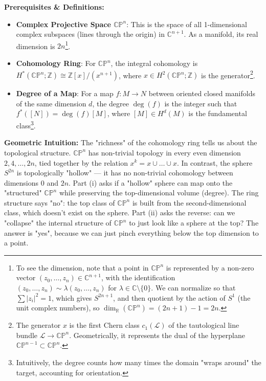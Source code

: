 \begin{solution}
\textbf{Prerequisites \& Definitions:}
\begin{itemize}
    \item \textbf{Complex Projective Space $\mathbb{CP}^n$}: This is the space of all 1-dimensional complex subspaces (lines through the origin) in $\mathbb{C}^{n+1}$. As a manifold, its real dimension is $2n$\footnote{To see the dimension, note that a point in $\mathbb{CP}^n$ is represented by a non-zero vector $(z_0, \dots, z_n) \in \mathbb{C}^{n+1}$, with the identification $(z_0, \dots, z_n) \sim \lambda(z_0, \dots, z_n)$ for $\lambda \in \mathbb{C} \setminus \{0\}$. We can normalize so that $\sum |z_i|^2 = 1$, which gives $S^{2n+1}$, and then quotient by the action of $S^1$ (the unit complex numbers), so $\dim_{\mathbb{R}}(\mathbb{CP}^n) = (2n+1) - 1 = 2n$.}.
    \item \textbf{Cohomology Ring}: For $\mathbb{CP}^n$, the integral cohomology is $H^*(\mathbb{CP}^n; \mathbb{Z}) \cong \mathbb{Z}[x]/(x^{n+1})$, where $x \in H^2(\mathbb{CP}^n; \mathbb{Z})$ is the generator\footnote{The generator $x$ is the first Chern class $c_1(\mathcal{L})$ of the tautological line bundle $\mathcal{L} \to \mathbb{CP}^n$. Geometrically, it represents the dual of the hyperplane $\mathbb{CP}^{n-1} \subset \mathbb{CP}^n$.}.
    \item \textbf{Degree of a Map}: For a map $f: M \to N$ between oriented closed manifolds of the same dimension $d$, the degree $\deg(f)$ is the integer such that $f^*([N]) = \deg(f)[M]$, where $[M] \in H^d(M)$ is the fundamental class\footnote{Intuitively, the degree counts how many times the domain "wraps around" the target, accounting for orientation.}.
\end{itemize}

\textbf{Geometric Intuition:}
The "richness" of the cohomology ring tells us about the topological structure. $\mathbb{CP}^n$ has non-trivial topology in every even dimension $2, 4, \dots, 2n$, tied together by the relation $x^k = x \cup \dots \cup x$. In contrast, the sphere $S^{2n}$ is topologically "hollow" — it has no non-trivial cohomology between dimensions $0$ and $2n$. Part (i) asks if a "hollow" sphere can map onto the "structured" $\mathbb{CP}^n$ while preserving the top-dimensional volume (degree). The ring structure says "no": the top class of $\mathbb{CP}^n$ is built from the second-dimensional class, which doesn't exist on the sphere. Part (ii) asks the reverse: can we "collapse" the internal structure of $\mathbb{CP}^n$ to just look like a sphere at the top? The answer is "yes", because we can just pinch everything below the top dimension to a point.


\end{solution}
